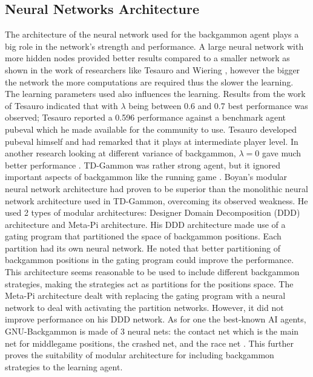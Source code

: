 \documentclass[12pt,a4paper]{article}
\begin{document}
\subsection{Neural Networks Architecture}
The architecture of the neural network used for the backgammon agent plays a big role in the network’s strength and performance. A large neural network with more hidden nodes provided better results compared to a smaller network as shown in the work of researchers like Tesauro \citeyear{DBLP:journals/ai/Tesauro02} and Wiering \citeyear{DBLP:journals/jilsa/Wiering10}, however the bigger the network the more computations are required thus the slower the learning. The learning parameters used also influences the learning. Results from the work of Tesauro \citeyear{DBLP:journals/ml/Tesauro98} indicated that with $\lambda$ being between 0.6 and 0.7 best performance was observed; Tesauro \citeyear{pubeval} reported a 0.596 performance against a benchmark agent pubeval which he made available for the community to use. Tesauro developed pubeval himself and had remarked that it plays at intermediate player level. In another research looking at different variance of backgammon, $\lambda=0$ gave much better performance \cite{DBLP:conf/ifip12/PapahristouR12}. TD-Gammon was rather strong agent, but it ignored important aspects of backgammon like the running game \cite{survey}. Boyan's \citeyear{boyan} modular neural network architecture had proven to be superior than the monolithic neural network architecture used in TD-Gammon, overcoming its observed weakness. He used 2 types of modular architectures: Designer Domain Decomposition (DDD) architecture and Meta-Pi architecture. His DDD architecture made use of a gating program that partitioned the space of backgammon positions. Each partition had its own neural network. He noted that better partitioning of backgammon positions in the gating program could improve the performance. This architecture seems reasonable to be used to include different backgammon strategies, making the strategies act as partitions for the positions space. The Meta-Pi architecture dealt with replacing the gating program with a neural network to deal with activating the partition networks. However, it did not improve performance on his DDD network. As for one the best-known AI agents, GNU-Backgammon is made of 3 neural nets: the contact net which is the main net for middlegame positions, the crashed net, and the race net \cite{gnubg}. This further proves the suitability of modular architecture for including backgammon strategies to the learning agent.
\end{document}
